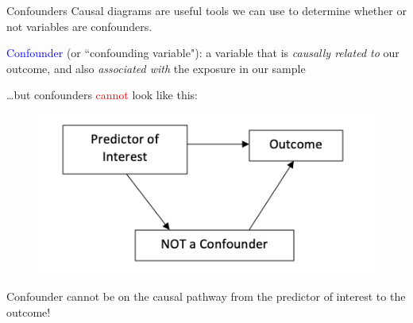 \documentclass[10pt,t]{beamer}
\begin{document}
\begin{frame}{Confounders}
Causal diagrams are useful tools we can use to determine whether or not variables are confounders.

\vspace{0.3cm}

\textcolor{blue}{Confounder} (or ``confounding variable"): a variable that is \textit{causally related to} our outcome, and also \textit{associated with} the exposure in our sample

\vspace{0.3cm} 

\dots but confounders \textcolor{red}{cannot} look like this:

\vspace{0.3cm}

\begin{figure}
	\centering \includegraphics[scale=0.4]{confounder3.png}
\end{figure}


\small Confounder cannot be on the causal pathway from the predictor of interest to the outcome!

\end{frame}
\end{document}
